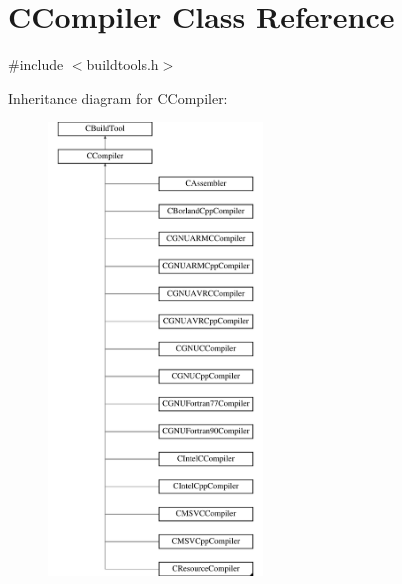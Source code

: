 \hypertarget{classCCompiler}{\section{C\-Compiler Class Reference}
\label{classCCompiler}
}


{\ttfamily \#include $<$buildtools.\-h$>$}

Inheritance diagram for C\-Compiler\-:\begin{figure}[H]
\begin{center}
\leavevmode
\includegraphics[height=12.000000cm]{d6/d5a/classCCompiler}
\end{center}
\end{figure}
